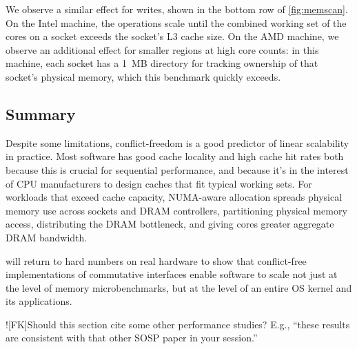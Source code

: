 We observe a similar effect for writes, shown in the bottom row of
\cref{fig:memscan}.  On the Intel machine, the operations scale until
the combined working set of the cores on a socket exceeds the socket's
L3 cache size.  On the AMD machine, we observe an additional
effect for smaller regions at high core counts: in this machine,
each socket has a 1~MB directory for tracking ownership of that
socket's physical memory, which this benchmark quickly exceeds.



\subsection{Summary}

Despite some limitations, conflict-freedom is a good predictor
of linear scalability in practice.  Most software has good cache
locality and
high cache hit rates both because this is crucial for sequential
performance, and because it's in the interest of CPU manufacturers to
design caches that fit typical working sets.  For workloads that
exceed cache capacity, NUMA-aware allocation spreads physical memory
use across sockets and DRAM controllers, partitioning physical memory
access, distributing the DRAM bottleneck, and giving cores greater
aggregate DRAM bandwidth.

 will return to hard numbers on real hardware to show
that conflict-free implementations of commutative interfaces enable
software to scale not just at the level of memory microbenchmarks, but
at the level of an entire OS kernel and its applications.

\XXX![FK]{Should this section cite some other performance studies?
  E.g., ``these results are consistent with that other SOSP paper in
  your session.''}




